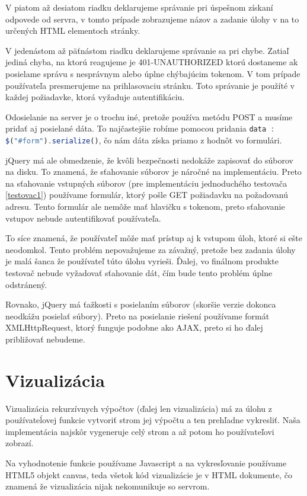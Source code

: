 V piatom až desiatom riadku deklarujeme správanie pri úspešnom získaní odpovede
od servra, v tomto prípade zobrazujeme názov a zadanie úlohy v na to určených
HTML elementoch stránky.

V jedenástom až päťnástom riadku deklarujeme správanie sa pri chybe. Zatiaľ jediná
chyba, na ktorú reagujeme je 401-UNAUTHORIZED ktorú dostaneme ak posielame
správu s nesprávnym alebo úplne chýbajúcim tokenom. V tom prípade používateľa presmerujeme
na prihlasovaciu stránku. Toto správanie je použíté v každej požiadavke, ktorá
vyžaduje autentifikáciu.

Odosielanie na server je o trochu iné, pretože používa metódu POST a musíme pridať
aj posielané dáta. To najčastejšie robíme pomocou pridania \newline
\lstinline[language=Javascript]{data : $("#form").serialize()}, čo nám dáta
získa priamo z hodnôt vo formulári.

jQuery má ale obmedzenie, že kvôli bezpečnosti nedokáže zapisovať do súborov na disku.
To znamená, že sťahovanie súborov je náročné na implementáciu. Preto na sťahovanie
vstupných súborov (pre implementáciu jednoduchého testovača \ref{testovac1}) používame
formulár, ktorý pošle GET požiadavku na požadovanú adresu. Tento formulár ale nemôže mať
hlavičku s tokenom, preto sťahovanie vstupov nebude autentifikovať používateľa.

To síce znamená, že používateľ môže mať prístup aj k vstupom úloh, ktoré si ešte neodomkol.
Tento problém nepovažujeme za závažný, pretože bez zadania úlohy je malá šanca že používateľ
túto úlohu vyrieši. Ďalej, vo finálnom produkte testovač nebude vyžadovať sťahovanie
dát, čím bude tento problém úplne odstránený.

Rovnako, jQuery má ťažkosti s posielaním súborov (skoršie verzie dokonca neodkážu
posielať súbory). Preto na posielanie riešení používame formát XMLHttpRequest, ktorý
funguje podobne ako AJAX, preto si ho ďalej približovať nebudeme.

\section{Vizualizácia}
Vizualizácia rekurzívnych výpočtov (ďalej len vizualizácia) má za úlohu z používateĺovej
funkcie vytvoriť strom jej výpočtu a ten prehľadne vykresliť. Naša implementácia
najskôr vygeneruje celý strom a až potom ho používateľovi zobrazí.

Na vyhodnotenie funkcie používame Javascript a na vykresľovanie používame HTML5 objekt canvas,
teda všetok kód vizualizácie je v HTML dokumente, čo znamená že vizualizácia nijak nekomunikuje so servrom.

